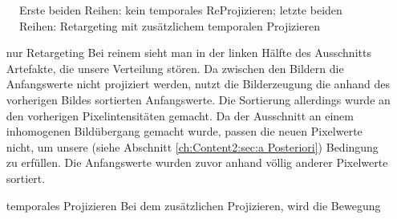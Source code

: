 \begin{figure}[H]
\begin{tcolorbox}[boxrule=4pt,sharp corners=downhill,title=Szene unter Kamerabewegung, fonttitle=\bfseries]
\begin{subfigure}[b]{0.2\linewidth}
         \caption{}
         \label{pic:TemporalRepr_4}
    \end{subfigure}
  \end{tcolorbox}
    \caption{Erste beiden Reihen: kein temporales ReProjizieren; letzte beiden Reihen: Retargeting mit zusätzlichem temporalen Projizieren}
    \label{fig:Auswirkung temporales Projizieren}
\end{figure}

\begin{itemize}
  \item[nur Retargeting] Bei reinem  sieht man in der linken Hälfte des Ausschnitts Artefakte, die unsere 
                          Verteilung stören. Da zwischen den Bildern die Anfangswerte nicht projiziert
                         werden, nutzt die Bilderzeugung die anhand des vorherigen Bildes sortierten Anfangswerte. Die Sortierung allerdings
                         wurde an den vorherigen Pixelintensitäten gemacht. Da der Ausschnitt an einem inhomogenen Bildübergang gemacht wurde,
                         passen die neuen Pixelwerte nicht, um unsere (siehe Abschnitt \ref{ch:Content2:sec:a Posteriori})
                         Bedingung zu erfüllen. Die Anfangswerte wurden zuvor anhand völlig anderer Pixelwerte sortiert. 

  \item[temporales Projizieren] Bei dem zusätzlichen Projizieren, wird die Bewegung
\end{itemize}

